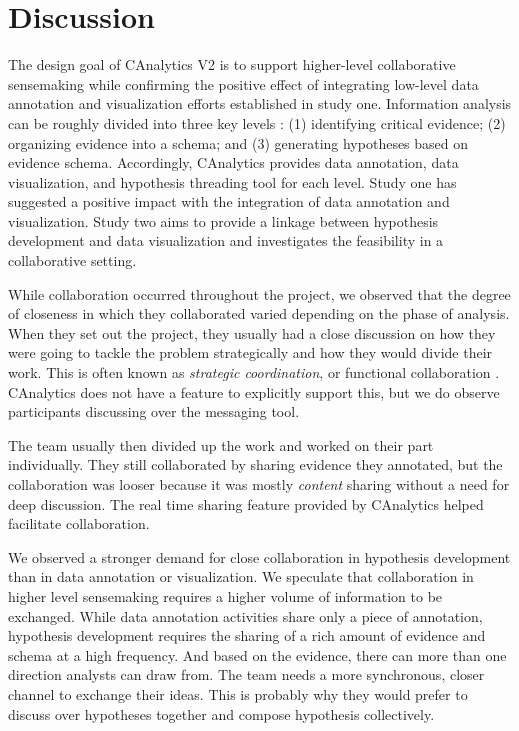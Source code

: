 \section{Discussion}

The design goal of CAnalytics V2 is to support higher-level collaborative sensemaking while confirming the positive effect of integrating low-level data annotation and visualization efforts established in study one. Information analysis can be roughly divided into three key levels \citep{Pirolli2005,Kang2014a}: (1) identifying critical evidence; (2) organizing evidence into a schema; and (3) generating hypotheses based on evidence schema. Accordingly, CAnalytics provides data annotation, data visualization, and hypothesis threading tool for each level. Study one has suggested a positive impact with the integration of data annotation and visualization. Study two aims to provide a linkage between hypothesis development and data visualization and investigates the feasibility in a collaborative setting.

While collaboration occurred throughout the project, we observed that the degree of closeness in which they collaborated varied depending on the phase of analysis. When they set out the project, they usually had a close discussion on how they were going to tackle the problem strategically and how they would divide their work. This is often known as \emph{strategic coordination}, or functional collaboration \citep{Kang2011}. CAnalytics does not have a feature to explicitly support this, but we do observe participants discussing over the messaging tool. 

The team usually then divided up the work and worked on their part individually. They still collaborated by sharing evidence they annotated, but the collaboration was looser because it was mostly \emph{content} sharing without a need for deep discussion. The real time sharing feature provided by CAnalytics helped facilitate collaboration. 

We observed a stronger demand for close collaboration in hypothesis development than in data annotation or visualization. We speculate that collaboration in higher level sensemaking requires a higher volume of information to be exchanged. While data annotation activities share only a piece of annotation, hypothesis development requires the sharing of a rich amount of evidence and schema at a high frequency. And based on the evidence, there can more than one direction analysts can draw from. The team needs a more synchronous, closer channel to exchange their ideas. This is probably why they would prefer to discuss over hypotheses together and compose hypothesis collectively.

